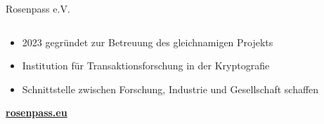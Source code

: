 \begin{frame}{Rosenpass e.V.}
  \begin{columns}[fullwidth,c]

    \begin{column}{.7\linewidth}
      \begin{itemize}
        \item 2023 gegründet zur Betreuung des gleichnamigen Projekts
        \vfill
        \item Institution für Transaktionsforschung in der Kryptografie
        \vfill
        \item Schnittstelle zwischen Forschung, Industrie und Gesellschaft schaffen
      \end{itemize}
      \bigskip
      \textbf{\url{rosenpass.eu}}
    \end{column}%
  \end{columns}
\end{frame}
